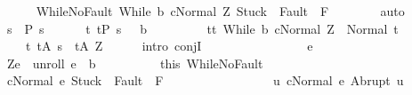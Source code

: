 \begin{isabellebody}
\ \ \ \ \isamarkupfalse%
\ WhileNoFault{\isacharcolon}\ {\isachardoublequoteopen}{\isasymGamma}{\isasymturnstile}{\isasymlangle}While\ b\ c{\isacharcomma}Normal\ Z{\isasymrangle}\ {\isasymRightarrow}{\isasymnotin}{\isacharparenleft}{\isacharbraceleft}Stuck{\isacharbraceright}\ {\isasymunion}\ Fault\ {\isacharbackquote}\ {\isacharparenleft}{\isacharminus}F{\isacharparenright}{\isacharparenright}{\isachardoublequoteclose}\isanewline
\ \ \ \ \ \ \isamarkupfalse%
\ auto\isanewline
\ \ \ \ \isamarkupfalse%
\ {\isachardoublequoteopen}s\ {\isasymin}\ {\isacharquery}P{\isacharprime}\ s\ {\isasymand}\ \isanewline
\ \ \ \ {\isacharparenleft}{\isasymforall}t{\isachardot}\ t{\isasymin}{\isacharparenleft}{\isacharquery}P{\isacharprime}\ s\ {\isasyminter}\ {\isacharminus}\ b{\isacharparenright}{\isasymlongrightarrow}\isanewline
\ \ \ \ \ \ \ \ \ t{\isasymin}{\isacharbraceleft}t{\isachardot}\ {\isasymGamma}{\isasymturnstile}{\isasymlangle}While\ b\ c{\isacharcomma}Normal\ Z{\isasymrangle}\ {\isasymRightarrow}\ Normal\ t{\isacharbraceright}{\isacharparenright}{\isasymand}\isanewline
\ \ \ \ {\isacharparenleft}{\isasymforall}t{\isachardot}\ t{\isasymin}{\isacharquery}A{\isacharprime}\ s\ {\isasymlongrightarrow}\ t{\isasymin}{\isacharquery}A{\isacharprime}\ Z{\isacharparenright}{\isachardoublequoteclose}\isanewline
\ \ \ \ \isamarkupfalse%
\ {\isacharparenleft}intro\ conjI{\isacharparenright}\isanewline
\ \ \ \ \ \ \isacommand{{\isacharbraceleft}}\isamarkupfalse%
\isanewline
\ \ \ \ \ \ \ \ \isamarkupfalse%
\ e\isanewline
\ \ \ \ \ \ \ \ \isamarkupfalse%
\ {\isachardoublequoteopen}{\isacharparenleft}Z{\isacharcomma}e{\isacharparenright}\ {\isasymin}\ {\isacharquery}unroll{\isachardoublequoteclose}\ {\isachardoublequoteopen}e\ {\isasymin}\ b{\isachardoublequoteclose}\isanewline
\ \ \ \ \ \ \ \ \isamarkupfalse%
\ this\ WhileNoFault\isanewline
\ \ \ \ \ \ \ \ \isamarkupfalse%
\ {\isachardoublequoteopen}{\isasymGamma}{\isasymturnstile}{\isasymlangle}c{\isacharcomma}Normal\ e{\isasymrangle}\ {\isasymRightarrow}{\isasymnotin}{\isacharparenleft}{\isacharbraceleft}Stuck{\isacharbraceright}\ {\isasymunion}\ Fault\ {\isacharbackquote}\ {\isacharparenleft}{\isacharminus}F{\isacharparenright}{\isacharparenright}\ {\isasymand}\ \isanewline
\ \ \ \ \ \ \ \ \ \ \ \ \ \ \ {\isacharparenleft}{\isasymforall}u{\isachardot}\ {\isasymGamma}{\isasymturnstile}{\isasymlangle}c{\isacharcomma}Normal\ e{\isasymrangle}\ {\isasymRightarrow}Abrupt\ u\ {\isasymlongrightarrow}\ \isanewline

\end{isabellebody}
